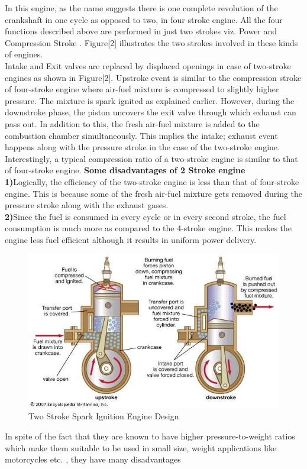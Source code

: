 \documentclass[11pt]{article}
\begin{document}
In this engine, as the name suggests there is one complete revolution of the crankshaft in one cycle as opposed to two, in four stroke engine. All the four functions described above are performed in just two strokes viz. Power and Compression Stroke \cite{ref5}. Figure[2] illustrates the two strokes involved in these kinds of engines.\\
Intake and Exit valves are replaced by displaced openings in case of two-stroke engines as shown in Figure[2]. Upstroke event is similar to the compression stroke of four-stroke engine where air-fuel mixture is compressed to slightly higher pressure. The mixture is spark ignited as explained earlier. However, during the downstroke phase, the piston uncovers the exit valve through which exhaust can pass out. In addition to this, the fresh air-fuel mixture is added to the combustion chamber simultaneously. This implies the intake; exhaust event happens along with the pressure stroke in the case of the two-stroke engine. Interestingly, a typical compression ratio of a two-stroke engine is similar to that of four-stroke engine.
\textbf{Some disadvantages of 2 Stroke engine}\\
\textbf{1)}Logically, the efficiency of the two-stroke engine is less than that of four-stroke engine. This is because some of the fresh air-fuel mixture gets removed during the pressure stroke along with the exhaust gases.  \\
\textbf{2)}Since the fuel is consumed in every cycle or in every second stroke, the fuel consumption is much more as compared to the 4-stroke engine. This makes the engine less fuel efficient although it results in uniform power delivery.

\begin{figure}[!h]
  \includegraphics[width=\linewidth,scale=0.75]{2strokeEngine.jpg}
  \caption{Two Stroke Spark Ignition Engine Design}
  \label{fig:Two Stroke Spark Ignition Engine Design}
\end{figure}
In spite of the fact that they are known to have higher pressure-to-weight ratios which make them suitable to be used in small size, weight applications like motorcycles etc. \cite{ref5}, they have many disadvantages\\
\end{document}
